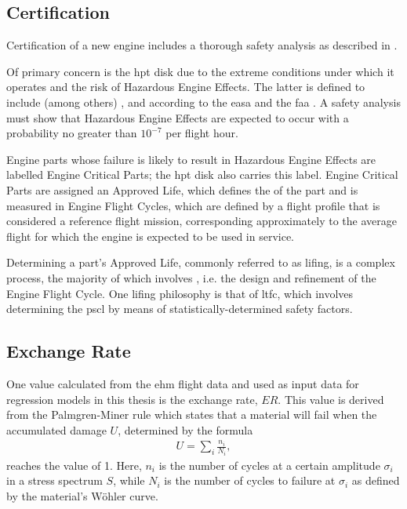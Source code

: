 
\subsection{Certification}
Certification of a new engine includes a thorough safety analysis as described in \cite{easa_certification_2015}.

Of primary concern is the \ac{hpt} disk due to the extreme conditions under which it operates and the risk of Hazardous Engine Effects. The latter is defined to include (among others) ,  and  according to the \ac{easa} and the \ac{faa} \cite[]{easa_certification_2015, faa_guidance_2007}. A safety analysis must show that Hazardous Engine Effects are expected to occur with a probability no greater than \(10^{-7}\) per flight hour.

Engine parts whose failure is likely to result in Hazardous Engine Effects are labelled Engine Critical Parts; the \ac{hpt} disk also carries this label. Engine Critical Parts are assigned an Approved Life, which defines the  \cite[]{easa_certification_2015} of the part and is measured in Engine Flight Cycles, which are defined by a flight profile that is considered a reference flight mission, corresponding approximately to the average flight for which the engine is expected to be used in service.

Determining a part's Approved Life, commonly referred to as lifing, is a complex process, the majority of which involves  \cite[]{corran_lifing_2007}, i.e. the design and refinement of the Engine Flight Cycle. One lifing philosophy is that of \ac{ltfc}, which involves determining the \ac{pscl} by means of statistically-determined safety factors.

\subsection{Exchange Rate}
One value calculated from the \ac{ehm} flight data and used as input data for regression models in this thesis is the exchange rate, \(ER\). This value is derived from the Palmgren-Miner rule \cite[]{palmgren_lebensdauer_1924} which states that a material will fail when the accumulated damage \(U\), determined by the formula
\begin{align}
    U = \sum_{i}{\frac{n_i}{N_i}},
\end{align}
reaches the value of 1. Here, \(n_i\) is the number of cycles at a certain amplitude \(\sigma_i\) in a stress spectrum \(S\), while \(N_i\) is the number of cycles to failure at \(\sigma_i\) as defined by the material's W\"ohler curve.


